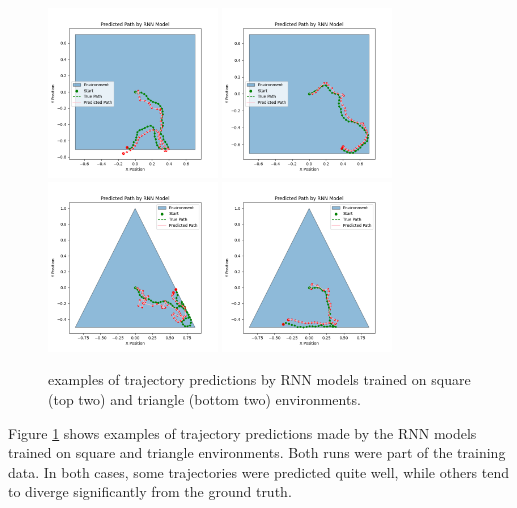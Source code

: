 \documentclass{article}
\begin{document}
\begin{figure}
    \centering
    \includegraphics[width=0.4\textwidth]{figures/rnn_square_model_prediction_bad.png}
    \includegraphics[width=0.4\textwidth]{figures/rnn_square_model_prediction_good.png}
    \includegraphics[width=0.4\textwidth]{figures/rnn_triangle_model_prediction_bad.png}
    \includegraphics[width=0.4\textwidth]{figures/rnn_triangle_model_prediction_good.png}
    \caption{examples of trajectory predictions by RNN models trained on square (top two) and triangle (bottom two) environments.}
    \label{fig:predictions}
\end{figure}
Figure \ref{fig:predictions} shows examples of trajectory predictions made by the RNN models trained on square and triangle environments. Both runs were part of the training data. In both cases, some trajectories were predicted quite well, while others tend to diverge significantly from the ground truth. 
\end{document}
